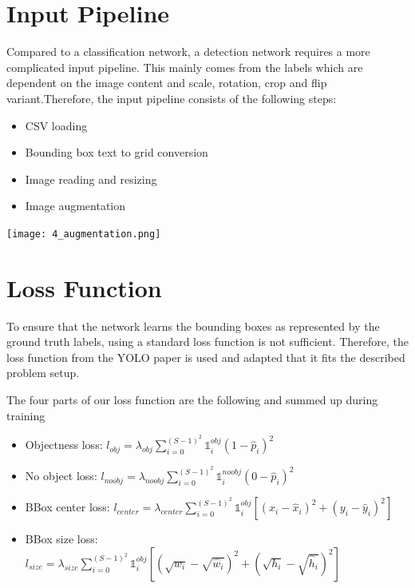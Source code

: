 \documentclass[landscape,a2,final,12pt]{issposter}
\begin{document}
\begin{samepage}
\begin{multicols}{3}
\section{Input Pipeline}
        \begin{small}Compared to a classification network, a detection network requires a more complicated input pipeline. This mainly comes from the 
        labels which are dependent on the image content and scale, rotation, crop and flip variant.Therefore, the input pipeline consists of the following steps:
        \begin{itemize}
            \item CSV loading
            \item Bounding box text to grid conversion
            \item Image reading and resizing
            \item Image augmentation
        \end{itemize}

        \begin{center}
            \texttt{[image: 4\_augmentation.png]}
        \end{center}

        \end{small}
       
    \columnbreak
    \section{Loss Function}
        \begin{minipage}[b]{0.3\textwidth}
            \begin{scriptsize} To ensure that the network learns the bounding boxes as represented by the ground truth labels, 
            using a standard loss function is not sufficient. Therefore, the loss function from the YOLO paper is used and adapted 
            that it fits the described problem setup.
            
            The four parts of our loss function are the following and summed up during training 
            \begin{itemize}
                \item Objectness loss: \quad $l_{obj} = \lambda_{obj} \sum_{i=0}^{(S-1)^2} \mathds{1}_{i}^{obj} (1 - \hat{p}_i)^2  $
                \item No object loss: \quad \quad $l_{noobj} = \lambda_{noobj} \sum_{i=0}^{(S-1)^2} \mathds{1}_{i}^{noobj} (0 - \hat{p}_i)^2  $
                \item BBox center loss: \quad $l_{center} = \lambda_{center} \sum_{i=0}^{(S-1)^2} \mathds{1}_{i}^{obj} [(x_i - \hat{x}_i)^2 + (y_i - \hat{y}_i)^2] $
                \item BBox size loss: \quad \quad$l_{size} = \lambda_{size} \sum_{i=0}^{(S-1)^2} \mathds{1}_{i}^{obj} [(\sqrt{w_i} - \sqrt{\hat{w}_i})^2 + (\sqrt{h_i} - \sqrt{\hat{h}_i})^2] $
            \end{itemize}


\end{scriptsize}
\end{minipage}
\end{multicols}
\end{samepage}
\end{document}
